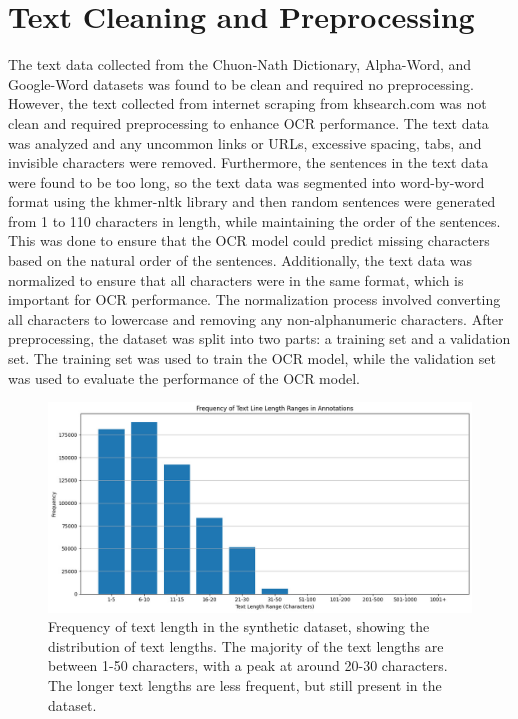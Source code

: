 \section{Text Cleaning and Preprocessing}
\label{sec:preprocessing}
The text data collected from the Chuon-Nath Dictionary, Alpha-Word, 
and Google-Word datasets was found to be clean and required no preprocessing. 
However, the text collected from internet scraping from khsearch.com was not 
clean and required preprocessing to enhance OCR performance. The text data was 
analyzed and any uncommon links or URLs, excessive spacing, tabs, and invisible 
characters were removed. Furthermore, the sentences in the text data were found 
to be too long, so the text data was segmented into word-by-word format using the 
khmer-nltk library and then random sentences were generated from 1 to 110 
characters in length, while maintaining the order of the sentences. 
This was done to ensure that the OCR model could predict missing characters 
based on the natural order of the sentences. Additionally, the text data was 
normalized to ensure that all characters were in the same format, which is 
important for OCR performance. The normalization process involved converting 
all characters to lowercase and removing any non-alphanumeric characters. 
After preprocessing, the dataset was split into two parts: a training set 
and a validation set. The training set was used to train the OCR model, 
while the validation set was used to evaluate the performance of the OCR model.

\begin{figure}[ht]
    \centering
    \includegraphics[width=\textwidth]{figures/frequency_of_text_length.png}
    \caption{Frequency of text length in the synthetic dataset, 
    showing the distribution of text lengths. The majority of the text  
    lengths are between 1-50 characters, with a peak at around 20-30 characters. 
    The longer text lengths are less frequent, but still present in the dataset.}
    \label{fig:frequency_of_text_length}
\end{figure}

